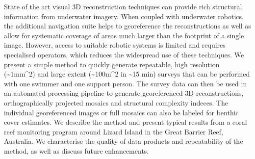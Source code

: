
State of the art visual 3D reconstruction techniques can provide rich structural information from underwater imagery. When coupled with underwater robotics, the additional navigation suite helps to georeference the reconstructions as well as allow for systematic coverage of areas much larger than the footprint of a single image. However, access to suitable robotic systems is limited and requires specialised operators, which reduces the widespread use of these techniques.
We present a simple method to quickly generate repeatable, high resolution (\sim{1mm^{2}}) and large extent (\sim{100m^{2}} in \sim{15 min}) surveys that can be performed with one swimmer and one support person. The survey data can then be used in an automated processing pipeline to generate georeferenced 3D reconstructions, orthographically projected mosaics and structural complexity indeces. The individual georeferenced images or full mosaics can also be labeled for benthic cover estimates.
We describe the method and present typical results from a coral reef monitoring program around Lizard Island in the Great Barrier Reef, Australia. We characterise the quality of data products and repeatability of the method, as well as discuss future enhancements.
  
  